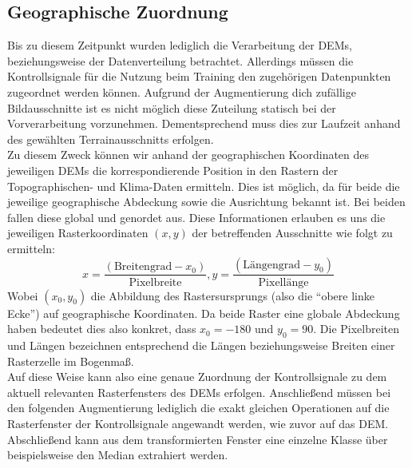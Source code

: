 \subsection{Geographische Zuordnung}

Bis zu diesem Zeitpunkt wurden lediglich die Verarbeitung der \ac{DEM}s, beziehungsweise der Datenverteilung betrachtet. Allerdings müssen die Kontrollsignale für die Nutzung beim Training den zugehörigen Datenpunkten zugeordnet werden können. Aufgrund der Augmentierung dich zufällige Bildausschnitte ist es nicht möglich diese Zuteilung statisch bei der Vorverarbeitung vorzunehmen. Dementsprechend muss dies zur Laufzeit anhand des gewählten Terrainausschnitts erfolgen. \\
Zu diesem Zweck können wir anhand der geographischen Koordinaten des jeweiligen \ac{DEM}s die korrespondierende Position in den Rastern der Topographischen- und Klima-Daten ermitteln. Dies ist möglich, da für beide die jeweilige geographische Abdeckung sowie die Ausrichtung bekannt ist. Bei beiden fallen diese global und genordet aus. Diese Informationen erlauben es uns die jeweiligen Rasterkoordinaten $(x,y)$ der betreffenden Ausschnitte wie folgt zu ermitteln:
\begin{equation}
    x = \frac{(\text{Breitengrad} - x_0)}{\text{Pixelbreite}}, 
    y = \frac{(\text{Längengrad} - y_0)}{\text{Pixellänge}}
\end{equation}
Wobei $(x_0, y_0)$ die Abbildung des Rastersursprungs (also die \enquote{obere linke Ecke}) auf geographische Koordinaten. Da beide Raster eine globale Abdeckung haben bedeutet dies also konkret, dass $x_0 = -180$ und $y_0 = 90$. Die Pixelbreiten und Längen bezeichnen entsprechend die Längen beziehungsweise Breiten einer Rasterzelle im Bogenmaß. \\
Auf diese Weise kann also eine genaue Zuordnung der Kontrollsignale zu dem aktuell relevanten Rasterfensters des \ac{DEM}s erfolgen. Anschließend müssen bei den folgenden Augmentierung lediglich die exakt gleichen Operationen auf die Rasterfenster der Kontrollsignale angewandt werden, wie zuvor auf das \ac{DEM}. Abschließend kann aus dem transformierten Fenster eine einzelne Klasse über beispielsweise den Median extrahiert werden. 